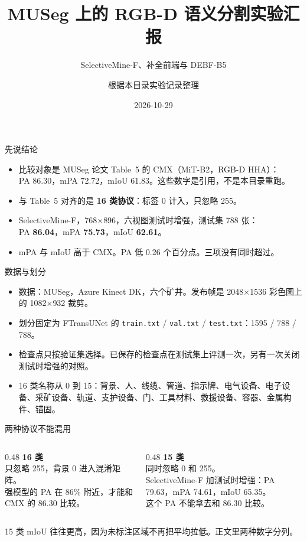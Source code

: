 \documentclass[aspectratio=169,11pt]{ctexbeamer}
\title{MUSeg 上的 RGB-D 语义分割实验汇报}
\subtitle{SelectiveMine-F、补全前端与 DEBF-B5}
\author{根据本目录实验记录整理}
\date{2026-10-29}
\begin{document}
\begin{frame}
  \titlepage
\end{frame}

\begin{frame}{先说结论}
  \begin{itemize}
    \item 比较对象是 MUSeg 论文 Table~5 的 CMX（MiT-B2，RGB-D HHA）：\\
      PA 86.30，mPA 72.72，mIoU 61.83。这些数字是引用，不是本目录重跑。
    \item 与 Table~5 对齐的是 \textbf{16 类协议}：标签 0 计入，只忽略 255。
    \item SelectiveMine-F，768$\times$896，六视图测试时增强，测试集 788 张：\\
      PA \textbf{86.04}，mPA \textbf{75.73}，mIoU \textbf{62.61}。
    \item mPA 与 mIoU 高于 CMX。PA 低 0.26 个百分点。三项没有同时超过。
  \end{itemize}
\end{frame}

\begin{frame}{数据与划分}
  \begin{itemize}
    \item 数据：MUSeg，Azure Kinect DK，六个矿井。发布帧是 2048$\times$1536 彩色图上的 1082$\times$932 裁剪。
    \item 划分固定为 FTransUNet 的 \texttt{train.txt} / \texttt{val.txt} / \texttt{test.txt}：1595 / 788 / 788。
    \item 检查点只按验证集选择。已保存的检查点在测试集上评测一次，另有一次关闭测试时增强的对照。
    \item 16 类名称从 0 到 15：背景、人、线缆、管道、指示牌、电气设备、电子设备、采矿设备、轨道、支护设备、门、工具材料、救援设备、容器、金属构件、锚固。
  \end{itemize}
\end{frame}

\begin{frame}{两种协议不能混用}
  \begin{columns}[T]
    \begin{column}{0.48\textwidth}
      \textbf{16 类}\\
      只忽略 255，背景 0 进入混淆矩阵。\\
      强模型的 PA 在 86\% 附近，才能和 CMX 的 86.30 比较。
    \end{column}
    \begin{column}{0.48\textwidth}
      \textbf{15 类}\\
      同时忽略 0 和 255。\\
      SelectiveMine-F 加测试时增强：PA 79.63，mPA 74.61，mIoU 65.35。\\
      这个 PA 不能拿去和 86.30 比较。
    \end{column}
  \end{columns}
  \vspace{0.6em}
  \small 15 类 mIoU 往往更高，因为未标注区域不再把平均拉低。正文里两种数字分列。
\end{frame}
\end{document}
